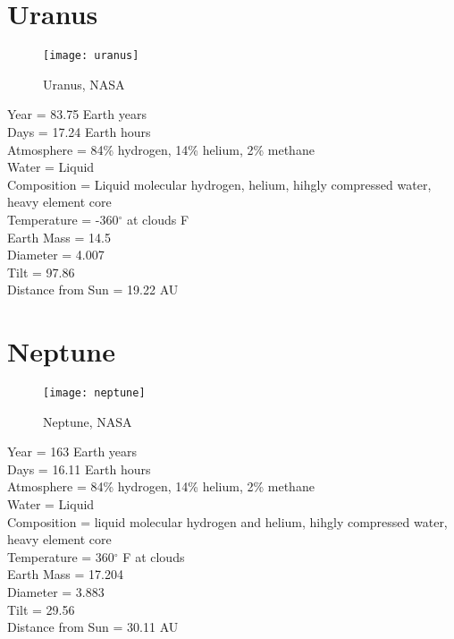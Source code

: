 \documentclass[12pt]{book}
\begin{document}
\section{Uranus}
\begin{wrapfigure}{R}{0.4\textwidth}
         \vspace{-1cm}
        \begin{center}
        \texttt{[image: uranus]}\caption{\scriptsize Uranus, NASA}
        \end{center}
         \vspace{-1cm}
    \end{wrapfigure}
Year = 83.75 Earth years\\
Days = 17.24 Earth hours\\
Atmosphere = 84\% hydrogen, 14\% helium, 2\% methane\\
Water = Liquid\\
Composition = Liquid molecular hydrogen, helium, hihgly compressed water, heavy element core\\
Temperature = -360$^{\circ}$ at clouds F\\
Earth Mass = 14.5\\
Diameter = 4.007\\ 
Tilt = 97.86\\
Distance from Sun = 19.22 AU\\  
\section{Neptune}
 \begin{wrapfigure}{R}{0.4\textwidth}
        \texttt{[image: neptune]}\caption{\scriptsize Neptune, NASA}
    \end{wrapfigure}
Year = 163 Earth years\\
Days = 16.11 Earth hours\\
Atmosphere = 84\% hydrogen, 14\% helium, 2\% methane\\
Water = Liquid\\
Composition = liquid molecular hydrogen and helium, hihgly compressed water, heavy element core\\
Temperature = 360$^{\circ}$ F at clouds\\
Earth Mass = 17.204\\
Diameter = 3.883\\ 
Tilt = 29.56\\
Distance from Sun = 30.11 AU\\
\newpage
\end{document}
